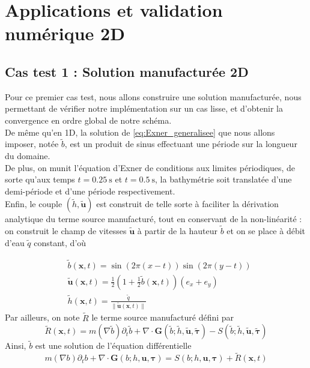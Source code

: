 \documentclass[11pt, a4paper, oneside]{report}
\begin{document}
\section{Applications et validation numérique 2D}

\subsection{Cas test 1 : Solution manufacturée 2D}

Pour ce premier cas test, nous allons construire une solution manufacturée, nous permettant de vérifier notre implémentation sur un cas lisse, et d'obtenir la convergence en ordre global de notre schéma. \\
De même qu'en 1D, la solution de \eqref{eq:Exner_generalisee} que nous allons imposer, notée $\widetilde{b}$, est un produit de sinus effectuant une période sur la longueur du domaine. \\
De plus, on munit l'équation d'Exner de conditions aux limites périodiques, de sorte qu'aux temps $t = \SI{0.25}{\second}$ et $t = \SI{0.5}{\second}$, la bathymétrie soit translatée d'une demi-période et d'une période respectivement. \\
Enfin, le couple $(\widetilde{h}, \bm{\widetilde{u}})$ est construit de telle sorte à faciliter la dérivation analytique du terme source manufacturé, tout en conservant de la non-linéarité : on construit le champ de vitesses $\bm{\widetilde{u}}$ à partir de la hauteur $\widetilde{b}$ et on se place à débit d'eau $\widetilde{q}$ constant, d'où
\begin{samepage}
\begin{equation}
    \begin{aligned}
        & \widetilde{b}(\bm{x}, t) = \sin \left( 2 \pi (x - t) \right) \sin \left( 2 \pi (y - t) \right) \\
        & \bm{\widetilde{u}}(\bm{x}, t) = \frac{1}{2} \left( 1 + \frac{1}{2} \widetilde{b}(\bm{x}, t) \right) (e_x + e_y) \\
        & \widetilde{h}(\bm{x}, t) = \frac{\widetilde{q}}{\| \bm{\widetilde{u}}(\bm{x}, t) \|}
    \end{aligned}
\end{equation}
Par ailleurs, on note $\widetilde{R}$ le terme source manufacturé défini par
\begin{equation}
    \widetilde{R}(\bm{x}, t) = m(\nabla \widetilde{b}) \partial_t \widetilde{b} + \nabla \cdot \bm{G} \left( \widetilde{b}; \widetilde{h}, \bm{\widetilde{u}}, \bm{\widetilde{\tau}} \right) - S \left( \widetilde{b}; \widetilde{h}, \bm{\widetilde{u}}, \bm{\widetilde{\tau}} \right)
\end{equation}
Ainsi, $\widetilde{b}$ est une solution de l'équation différentielle
\begin{equation}
    m(\nabla b) \partial_t b + \nabla \cdot \bm{G} \left( b; h, \bm{u}, \bm{\tau} \right) = S \left( b; h, \bm{u}, \bm{\tau} \right) + \widetilde{R}(\bm{x}, t)
\end{equation}
\end{samepage}
\end{document}
